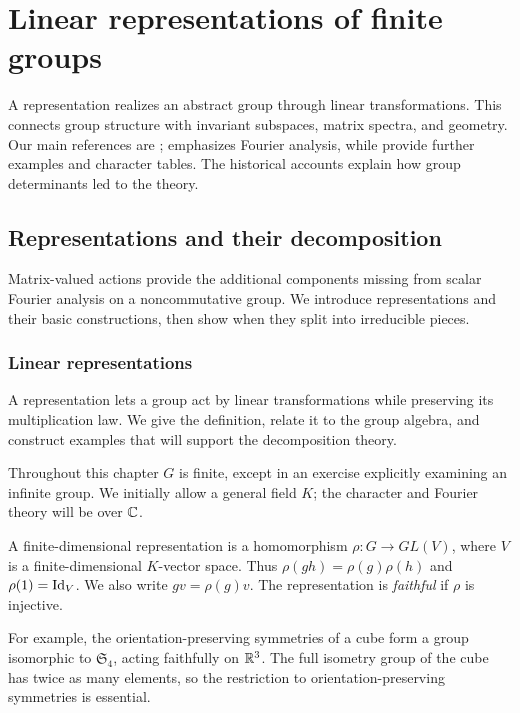 \chapter{Linear representations of finite groups}
\label{chap-linear-representations-finite-groups}

A representation realizes an abstract group through linear transformations.
This connects group structure with invariant subspaces, matrix spectra,
and geometry. Our main references are \cite{serre-representation,fulton};
\cite{goodman} emphasizes Fourier analysis, while \cite{alperin,collins}
provide further examples and character tables. The historical accounts
\cite{lam-representation-ams-part1,lam-representation-ams-part2} explain
how group determinants led to the theory.

\section{Representations and their decomposition}

Matrix-valued actions provide the additional components missing from scalar
Fourier analysis on a noncommutative group. We introduce representations and
their basic constructions, then show when they split into irreducible
pieces.

\subsection{Linear representations}

A representation lets a group act by linear transformations while preserving
its multiplication law. We give the definition, relate it to the group
algebra, and construct examples that will support the decomposition theory.

Throughout this chapter $G$ is finite, except in an exercise explicitly
examining an infinite group. We initially allow a general field $K$;
the character and Fourier theory will be over $\mathbb{C}$.


\begin{defn}
\label{defn-linear-representation}\label{notation-70}
A finite-dimensional representation is a homomorphism
$\rho:G\to GL(V)$, where $V$ is a finite-dimensional $K$-vector space.
Thus $\rho(gh)=\rho(g)\rho(h)$ and $\rho(1)=\operatorname{Id}_V$.
We also write $gv=\rho(g)v$. The representation is \emph{faithful} if
$\rho$ is injective.
\end{defn}
For example, the orientation-preserving symmetries of a cube form a group
isomorphic to $\mathfrak S_4$, acting faithfully on $\mathbb{R}^3$. The full
isometry group of the cube has twice as many elements, so the restriction
to orientation-preserving symmetries is essential.

